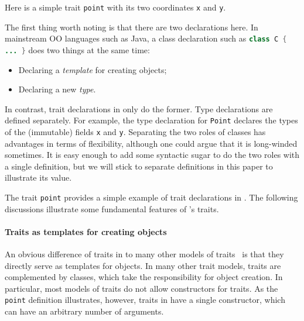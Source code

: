 Here is a simple trait \lstinline{point} with its two coordinates \lstinline{x}
and \lstinline{y}. %


The first thing worth noting is that there are two declarations here.
In mainstream OO languages such as Java, a class declaration such as
\lstinline[language=java]$class C { ... }$ does two things at the same time:

\begin{itemize}
\item Declaring a \textit{template} for creating objects;
\item Declaring a new \textit{type}.
\end{itemize}

In contrast, trait declarations in \name only do the former. Type declarations
are defined separately. For example, the type declaration for \lstinline{Point}
declares the types of the (immutable) fields \lstinline{x} and \lstinline{y}.
Separating the two roles of classes has advantages in terms of flexibility,
although one could argue that it is long-winded sometimes. It is easy enough to
add some syntactic sugar to do the two roles with a single definition, but we
will stick to separate definitions in this paper to illustrate its value.

The trait \lstinline{point} provides a simple example of trait
declarations in \name. The following discussions illustrate 
some fundamental features of \name's traits.

\paragraph{Traits as templates for creating objects} An obvious difference of
traits in \name to many other models of
traits~\cite{scharli2003traits,fisher2004typed,odersky2005scalable} is that they
directly serve as templates for objects. In many other trait models, traits are
complemented by classes, which take the responsibility for object creation. In
particular, most models of traits do not allow constructors for traits. As the
\lstinline{point} definition illustrates, however, traits in \name have a single
constructor, which can have an arbitrary number of arguments.


